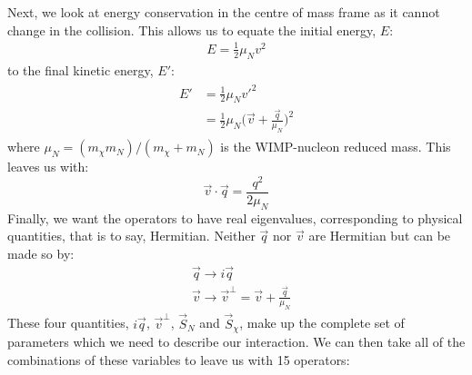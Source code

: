 \par
Next, we look at energy conservation in the centre of mass frame as it cannot change in the collision.
This allows us to equate the initial energy, $E$:
\begin{align}
    E  = \frac{1}{2}\mu_N v^2
\end{align}
to the final kinetic energy, $E'$:
\begin{align}
\begin{split}
    E' &= \frac{1}{2}\mu_N v'^2 \\
       &= \frac{1}{2}\mu_N \bigg(\vec{v} + \frac{\vec{q}}{\mu_N}\bigg)^2
\end{split}
\end{align}
where $\mu_N=(m_\chi m_N)/(m_\chi + m_N)$ is the WIMP-nucleon reduced mass.
This leaves us with:
\begin{equation}
    \vec{v} \cdot \vec{q} = \frac{q^2}{2\mu_N}
\end{equation}
Finally, we want the operators to have real eigenvalues, corresponding to physical quantities, that is to say, Hermitian.
Neither $\vec{q}$ nor $\vec{v}$ are Hermitian but can be made so by:
\begin{equation}
\begin{split}
    &\vec{q} \rightarrow i\vec{q} \\
    &\vec{v} \rightarrow \vec{v}^{\bot} = \vec{v} + \frac{\vec{q}}{\mu_N}
\end{split}
\end{equation}
These four quantities, $i\vec{q}$, $\vec{v}^{\bot}$, $\vec{S}_N$ and $\vec{S}_\chi$, make up the complete set of parameters which we need to describe our interaction.
We can then take all of the combinations of these variables to leave us with 15 operators:
